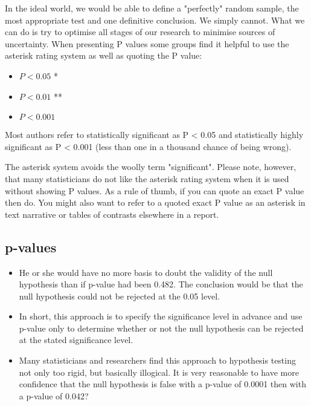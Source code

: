 \documentclass[]{report}
\begin{document}
In the ideal world, we would be able to define a "perfectly" random sample, the most appropriate test and one definitive conclusion. We simply cannot. What we can do is try to optimise all stages of our research to minimise sources of uncertainty. When presenting P values some groups find it helpful to use the asterisk rating system as well as quoting the P value:

\begin{itemize}
	\item $P < 0.05$ *
	\item $P < 0.01$ **
	\item $P < 0.001$
\end{itemize}

Most authors refer to statistically significant as P < 0.05 and statistically highly significant as P < 0.001 (less than one in a thousand chance of being wrong).

The asterisk system avoids the woolly term "significant". Please note, however, that many statisticians do not like the asterisk rating system when it is used without showing P values. As a rule of thumb, if you can quote an exact P value then do. You might also want to refer to a quoted exact P value as an asterisk in text narrative or tables of contrasts elsewhere in a report.



	
	
	
	
	\subsection{p-values}
	\begin{itemize}
		\item He or she would have no more basis to doubt the validity of the null hypothesis than if p-value had been 0.482. The conclusion would be that the null hypothesis could not be rejected at the 0.05 level. \item In short, this approach is to specify the significance level in advance and use p-value only to determine whether or not the null hypothesis can be rejected at the stated significance level.
		\item
		Many statisticians and researchers find this approach to hypothesis testing not only too rigid, but basically illogical. It is very reasonable to  have more confidence that the null hypothesis is false with a p-value of 0.0001 then with a p-value of 0.042?
	\end{itemize}
	
\end{document}

